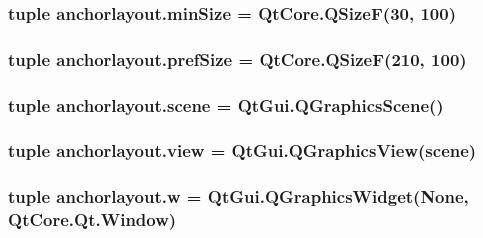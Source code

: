 \subsubsection[{min\+Size}]{\setlength{\rightskip}{0pt plus 5cm}tuple anchorlayout.\+min\+Size = Qt\+Core.\+Q\+Size\+F(30, 100)}\label{namespaceanchorlayout_aeaf0c153482d3c7039fc82094bbdf5e0}
\hypertarget{namespaceanchorlayout_ae2262beb1374bb0c4c441df71bf98d6d}{}
\subsubsection[{pref\+Size}]{\setlength{\rightskip}{0pt plus 5cm}tuple anchorlayout.\+pref\+Size = Qt\+Core.\+Q\+Size\+F(210, 100)}\label{namespaceanchorlayout_ae2262beb1374bb0c4c441df71bf98d6d}
\hypertarget{namespaceanchorlayout_aa68524ad4dd580dcb4ea20ddfcb4193a}{}
\subsubsection[{scene}]{\setlength{\rightskip}{0pt plus 5cm}tuple anchorlayout.\+scene = Qt\+Gui.\+Q\+Graphics\+Scene()}\label{namespaceanchorlayout_aa68524ad4dd580dcb4ea20ddfcb4193a}
\hypertarget{namespaceanchorlayout_aa3a431c1d8b12d550cdf5c080ff33504}{}
\subsubsection[{view}]{\setlength{\rightskip}{0pt plus 5cm}tuple anchorlayout.\+view = Qt\+Gui.\+Q\+Graphics\+View({\bf scene})}\label{namespaceanchorlayout_aa3a431c1d8b12d550cdf5c080ff33504}
\hypertarget{namespaceanchorlayout_aaee3a0514cbf2b10431ce766de2b8af1}{}
\subsubsection[{w}]{\setlength{\rightskip}{0pt plus 5cm}tuple anchorlayout.\+w = Qt\+Gui.\+Q\+Graphics\+Widget(None, Qt\+Core.\+Qt.\+Window)}\label{namespaceanchorlayout_aaee3a0514cbf2b10431ce766de2b8af1}
